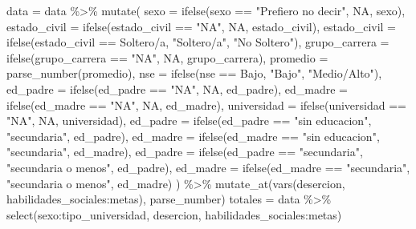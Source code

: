 \documentclass[
  letterpaper,
  DIV=11,
  numbers=noendperiod]{scrartcl}
\newenvironment{Shaded}{\begin{snugshade}}{\end{snugshade}}
\newcommand{\AttributeTok}[1]{\textcolor[rgb]{0.40,0.45,0.13}{#1}}
\newcommand{\ConstantTok}[1]{\textcolor[rgb]{0.56,0.35,0.01}{#1}}
\newcommand{\FunctionTok}[1]{\textcolor[rgb]{0.28,0.35,0.67}{#1}}
\newcommand{\NormalTok}[1]{\textcolor[rgb]{0.00,0.23,0.31}{#1}}
\newcommand{\OtherTok}[1]{\textcolor[rgb]{0.00,0.23,0.31}{#1}}
\newcommand{\SpecialCharTok}[1]{\textcolor[rgb]{0.37,0.37,0.37}{#1}}
\newcommand{\StringTok}[1]{\textcolor[rgb]{0.13,0.47,0.30}{#1}}
\begin{document}
\begin{Shaded}
\begin{Highlighting}[]
\NormalTok{data }\OtherTok{=}\NormalTok{ data }\SpecialCharTok{\%\textgreater{}\%} 
    \FunctionTok{mutate}\NormalTok{(}
        \AttributeTok{sexo =} \FunctionTok{ifelse}\NormalTok{(sexo }\SpecialCharTok{==} \StringTok{"Prefiero no decir"}\NormalTok{, }\ConstantTok{NA}\NormalTok{, sexo),}
        \AttributeTok{estado\_civil =} \FunctionTok{ifelse}\NormalTok{(estado\_civil }\SpecialCharTok{==} \StringTok{"NA"}\NormalTok{, }\ConstantTok{NA}\NormalTok{, estado\_civil),}
        \AttributeTok{estado\_civil =} \FunctionTok{ifelse}\NormalTok{(estado\_civil }\SpecialCharTok{==} \StringTok{\textquotesingle{}Soltero/a\textquotesingle{}}\NormalTok{, }\StringTok{"Soltero/a"}\NormalTok{, }\StringTok{"No Soltero"}\NormalTok{),}
        \AttributeTok{grupo\_carrera =} \FunctionTok{ifelse}\NormalTok{(grupo\_carrera }\SpecialCharTok{==} \StringTok{"NA"}\NormalTok{, }\ConstantTok{NA}\NormalTok{, grupo\_carrera),}
        \AttributeTok{promedio =} \FunctionTok{parse\_number}\NormalTok{(promedio),}
        \AttributeTok{nse =} \FunctionTok{ifelse}\NormalTok{(nse }\SpecialCharTok{==} \StringTok{\textquotesingle{}Bajo\textquotesingle{}}\NormalTok{, }\StringTok{"Bajo"}\NormalTok{, }\StringTok{"Medio/Alto"}\NormalTok{),}
        \AttributeTok{ed\_padre =} \FunctionTok{ifelse}\NormalTok{(ed\_padre }\SpecialCharTok{==} \StringTok{"NA"}\NormalTok{, }\ConstantTok{NA}\NormalTok{, ed\_padre),}
        \AttributeTok{ed\_madre =} \FunctionTok{ifelse}\NormalTok{(ed\_madre }\SpecialCharTok{==} \StringTok{"NA"}\NormalTok{, }\ConstantTok{NA}\NormalTok{, ed\_madre),}
        \AttributeTok{universidad =} \FunctionTok{ifelse}\NormalTok{(universidad }\SpecialCharTok{==} \StringTok{"NA"}\NormalTok{, }\ConstantTok{NA}\NormalTok{, universidad),}
        \AttributeTok{ed\_padre =} \FunctionTok{ifelse}\NormalTok{(ed\_padre }\SpecialCharTok{==} \StringTok{"sin educacion"}\NormalTok{, }\StringTok{"secundaria"}\NormalTok{, ed\_padre),}
        \AttributeTok{ed\_madre =} \FunctionTok{ifelse}\NormalTok{(ed\_madre }\SpecialCharTok{==} \StringTok{"sin educacion"}\NormalTok{, }\StringTok{"secundaria"}\NormalTok{, ed\_madre),}
        \AttributeTok{ed\_padre =} \FunctionTok{ifelse}\NormalTok{(ed\_padre }\SpecialCharTok{==} \StringTok{"secundaria"}\NormalTok{, }\StringTok{"secundaria o menos"}\NormalTok{, ed\_padre),}
        \AttributeTok{ed\_madre =} \FunctionTok{ifelse}\NormalTok{(ed\_madre }\SpecialCharTok{==} \StringTok{"secundaria"}\NormalTok{, }\StringTok{"secundaria o menos"}\NormalTok{, ed\_madre)}
\NormalTok{        ) }\SpecialCharTok{\%\textgreater{}\%}
    \FunctionTok{mutate\_at}\NormalTok{(}\FunctionTok{vars}\NormalTok{(desercion, habilidades\_sociales}\SpecialCharTok{:}\NormalTok{metas), parse\_number)}
\NormalTok{totales }\OtherTok{=}\NormalTok{ data }\SpecialCharTok{\%\textgreater{}\%} \FunctionTok{select}\NormalTok{(sexo}\SpecialCharTok{:}\NormalTok{tipo\_universidad, desercion, habilidades\_sociales}\SpecialCharTok{:}\NormalTok{metas)}
\end{Highlighting}
\end{Shaded}
\end{document}
